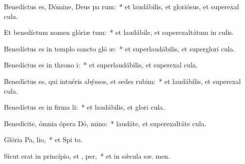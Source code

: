 \item Benedíctus es, Dómine, Deus pa rum:~* et laudábilis, et gloriósus, et superexal  cula.

\item Et benedíctum nomen glóriæ  tum:~* et laudábile, et superexaltátum in  culis.

\item Benedíctus es in templo sancto gló æ:~* et superlaudábilis, et superglori  cula.

\item Benedíctus es in throno  i:~* et superlaudábilis, et superexal  cula.

\item Benedíctus es, qui intuéris abýssos, et sedes  rubim:~* et laudábilis, et superexal  cula.

\item Benedíctus es in firma li:~* et laudábilis, et glori  cula.

\item Benedícite, ómnia ópera Dó, mino:~* laudáte, et superexaltáte   cula.

\item Glória Pa,  lio,~* et Spi to.

\item Sicut erat in princípio, et ,  per,~* et in sǽcula sæ. men.